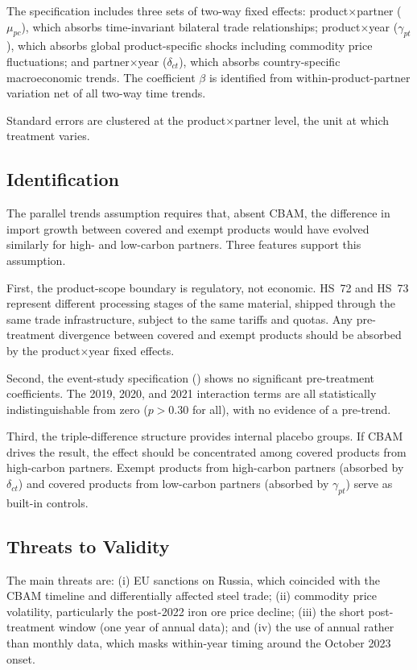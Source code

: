 \documentclass[12pt]{article}
\begin{document}
The specification includes three sets of two-way fixed effects: product$\times$partner ($\mu_{pc}$), which absorbs time-invariant bilateral trade relationships; product$\times$year ($\gamma_{pt}$), which absorbs global product-specific shocks including commodity price fluctuations; and partner$\times$year ($\delta_{ct}$), which absorbs country-specific macroeconomic trends. The coefficient $\beta$ is identified from within-product-partner variation net of all two-way time trends.

Standard errors are clustered at the product$\times$partner level, the unit at which treatment varies.

\subsection{Identification}

The parallel trends assumption requires that, absent CBAM, the difference in import growth between covered and exempt products would have evolved similarly for high- and low-carbon partners. Three features support this assumption.

First, the product-scope boundary is regulatory, not economic. HS~72 and HS~73 represent different processing stages of the same material, shipped through the same trade infrastructure, subject to the same tariffs and quotas. Any pre-treatment divergence between covered and exempt products should be absorbed by the product$\times$year fixed effects.

Second, the event-study specification () shows no significant pre-treatment coefficients. The 2019, 2020, and 2021 interaction terms are all statistically indistinguishable from zero ($p > 0.30$ for all), with no evidence of a pre-trend.

Third, the triple-difference structure provides internal placebo groups. If CBAM drives the result, the effect should be concentrated among covered products from high-carbon partners. Exempt products from high-carbon partners (absorbed by $\delta_{ct}$) and covered products from low-carbon partners (absorbed by $\gamma_{pt}$) serve as built-in controls.

\subsection{Threats to Validity}

The main threats are: (i) EU sanctions on Russia, which coincided with the CBAM timeline and differentially affected steel trade; (ii) commodity price volatility, particularly the post-2022 iron ore price decline; (iii) the short post-treatment window (one year of annual data); and (iv) the use of annual rather than monthly data, which masks within-year timing around the October 2023 onset.
\end{document}
